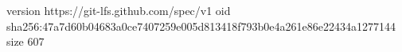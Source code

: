 version https://git-lfs.github.com/spec/v1
oid sha256:47a7d60b04683a0ce7407259e005d813418f793b0e4a261e86e22434a1277144
size 607
